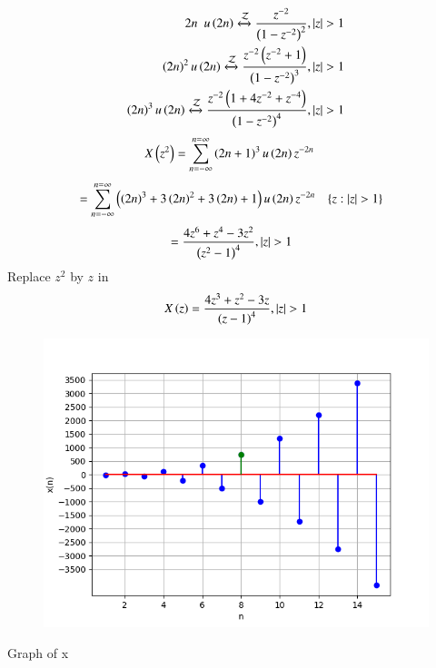 \documentclass[beamer]{IEEEtran}
\theoremstyle{remark}
\begin{document}
\begin{align}
	{2n} \hspace{5pt} u\left(2n\right) \xleftrightarrow{\mathcal{Z}} \frac{z^{-2}}{\left(1-z^{-2}\right)^2},\left\vert z\right\vert >1 \\
    \left(2n\right)^2  u\left(2n\right) \xleftrightarrow{\mathcal{Z}} \frac{z^{-2}\left(z^{-2}+1\right)}{\left(1-z^{-2}\right)^3},\left\vert z\right\vert > 1 \\
	\left(2n\right)^3 u\left(2n\right) \xleftrightarrow{\mathcal{Z}}  \frac{z^{-2}\left(1+4z^{-2}+z^{-4}\right)}{\left(1-z^{-2}\right)^4},\left\vert z\right\vert >1
\end{align}
\begin{align}
	X\left(z^2\right)&=\sum_{n=-\infty}^{n=\infty}\left(2n+1\right)^{3}u\left(2n\right)z^{-2n}
\end{align}
\begin{align}
	&=\sum_{n=-\infty}^{n=\infty}\brak{\brak{2n}^3+3\brak{2n}^2+3\brak{2n}+1}u\brak{2n}z^{-2n}\hspace{10pt}
\{z:|z|>1\}
\end{align} 
\begin{align}
	&=\frac{4z^6+z^4-3z^2}{\left(z^2-1\right)^4}, \left\vert z\right\vert>1 
\end{align}
Replace $z^2$ by $z$ in 
\begin{align}
	X\left(z\right)=\frac{4z^3+z^2-3z}{\left(z-1\right)^4} , \left\vert z\right\vert>1
\end{align}

\begin{figure}[h]
    \centering
    \includegraphics[width=1 \columnwidth]{figs/graph.png} 
    \label{fig:11.9.1.9.1}
\end{figure}
\begin{center}
Graph of x
   \end{center}
\end{document}
